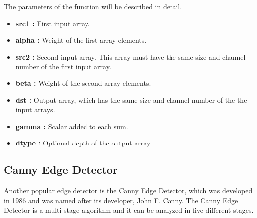   The parameters of the function will be described in detail.
  
    \begin{itemize}

\item \textbf{src1 : }First input array.

\item \textbf{alpha : }Weight of the first array elements.

\item \textbf{src2 : }Second input array. This array must have the same size and channel number of the first input array.

\item \textbf{beta : }Weight of the second array elements.

\item \textbf{dst : }Output array, which has the same size and channel number of the the input arrays.

\item \textbf{gamma : }Scalar added to each sum.

\item \textbf{dtype : }Optional depth of the output array.

 \end{itemize}






 
%
\subsection{Canny Edge Detector}\label{sec:Canny Edge Detector}

Another popular edge detector is the Canny Edge Detector, which was developed in 1986 and was named after its developer, John F. Canny. The Canny Edge Detector is a multi-stage algorithm and it can be analyzed in five different stages.\cite{Canny_Edge_Detector2}

